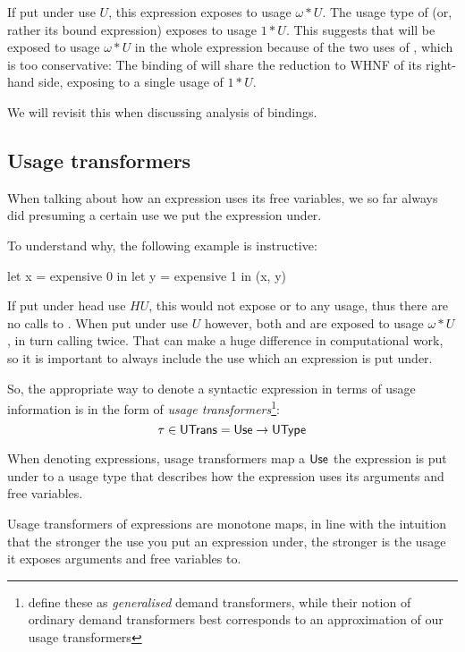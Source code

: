If put under use $U$, this expression exposes  to usage $\omega*U$. 
The usage type of  (or, rather its bound expression) exposes  to usage $1*U$.
This suggests that  will be exposed to usage $\omega*U$ in the whole expression because of the two uses of , which is too conservative:
The binding of  will share the reduction to WHNF of its right-hand side, exposing  to a single usage of $1*U$.

We will revisit this when discussing analysis of  bindings.

\subsection{Usage transformers}\label{sec:utrans}

When talking about how an expression uses its free variables, we so far always did presuming a certain use we put the expression under.

To understand why, the following example is instructive:

\begin{haskellcode}
let x = expensive 0
in let y = expensive 1
   in (x, y)
\end{haskellcode}

If put under head use $HU$, this would not expose  or  to any usage, thus there are no calls to .
When put under use $U$ however, both  and  are exposed to usage $\omega*U$, in turn calling  twice.
That can make a huge difference in computational work, so it is important to always include the use which an expression is put under.

So, the appropriate way to denote a syntactic expression in terms of usage information is in the form of \emph{usage transformers}\footnote{\textcite{card} define these as \emph{generalised} demand transformers, while their notion of ordinary demand transformers best corresponds to an approximation of our usage transformers}:
\[
\tau \in \text{\textsf{UTrans}} = \text{\textsf{Use}} \to \text{\textsf{UType}}
\]

When denoting expressions, usage transformers map a $\text{\textsf{Use}}$ the expression is put under to a usage type that describes how the expression uses its arguments and free variables.

Usage transformers of expressions are monotone maps, in line with the intuition that the stronger the use you put an expression under, the stronger is the usage it exposes arguments and free variables to.

